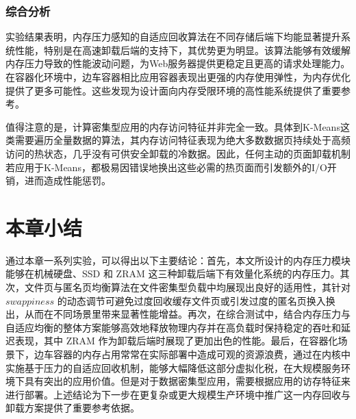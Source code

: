 \subsubsection{综合分析}
实验结果表明，内存压力感知的自适应回收算法在不同存储后端下均能显著提升系统性能，特别是在高速卸载后端的支持下，其优势更为明显。该算法能够有效缓解内存压力导致的性能波动问题，为Web服务器提供更稳定且更高的请求处理能力。在容器化环境中，边车容器相比应用容器表现出更强的内存使用弹性，为内存优化提供了更多可能性。这些发现为设计面向内存受限环境的高性能系统提供了重要参考。

值得注意的是，计算密集型应用的内存访问特征并非完全一致。具体到K-Means这类需要遍历全量数据的算法，其内存访问特征表现为绝大多数数据页持续处于高频访问的热状态，几乎没有可供安全卸载的冷数据。因此，任何主动的页面卸载机制若应用于K-Means，都极易因错误地换出这些必需的热页面而引发额外的I/O开销，进而造成性能惩罚。


\section{本章小结}

通过本章一系列实验，可以得出以下主要结论：首先，本文所设计的内存压力模块能够在机械硬盘、SSD 和 ZRAM 这三种卸载后端下有效量化系统的内存压力。其次，文件页与匿名页均衡算法在文件密集型负载中均展现出良好的适用性，其针对 \(swappiness\)  的动态调节可避免过度回收缓存文件页或引发过度的匿名页换入换出，从而在不同场景里带来显著性能增益。再次，在综合测试中，结合内存压力与自适应均衡的整体方案能够高效地释放物理内存并在高负载时保持稳定的吞吐和延迟表现，其中 ZRAM 作为卸载后端时展现了更加出色的性能。最后，在容器化场景下，边车容器的内存占用常常在实际部署中造成可观的资源浪费，通过在内核中实施基于压力的自适应回收机制，能够大幅降低这部分虚拟化税，在大规模服务环境下具有突出的应用价值。但是对于数据密集型应用，需要根据应用的访存特征来进行部署。上述结论为下一步在更复杂或更大规模生产环境中推广这一内存回收与卸载方案提供了重要参考依据。
